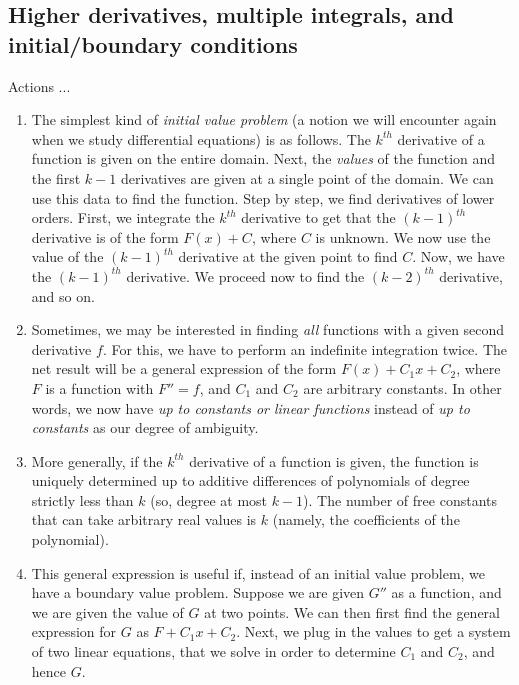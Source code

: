 \documentclass[10pt]{amsart}
\begin{document}
\subsection{Higher derivatives, multiple integrals, and initial/boundary conditions}

Actions ...

\begin{enumerate}
\item The simplest kind of {\em initial value problem} (a notion we
  will encounter again when we study differential equations) is as
  follows. The $k^{th}$ derivative of a function is given on the
  entire domain. Next, the {\em values} of the function and the first
  $k - 1$ derivatives are given at a single point of the domain. We
  can use this data to find the function. Step by step, we find
  derivatives of lower orders. First, we integrate the $k^{th}$
  derivative to get that the $(k-1)^{th}$ derivative is of the form
  $F(x) + C$, where $C$ is unknown. We now use the value of the
  $(k-1)^{th}$ derivative at the given point to find $C$. Now, we have
  the $(k-1)^{th}$ derivative. We proceed now to find the $(k-2)^{th}$
  derivative, and so on.
\item Sometimes, we may be interested in finding {\em all} functions
  with a given second derivative $f$. For this, we have to perform an
  indefinite integration twice. The net result will be a general
  expression of the form $F(x) + C_1x + C_2$, where $F$ is a function
  with $F'' = f$, and $C_1$ and $C_2$ are arbitrary constants. In
  other words, we now have {\em up to constants or linear functions}
  instead of {\em up to constants} as our degree of ambiguity.
\item More generally, if the $k^{th}$ derivative of a function is
  given, the function is uniquely determined up to additive
  differences of polynomials of degree strictly less than $k$ (so,
  degree at most $k - 1$). The number of free constants that can take
  arbitrary real values is $k$ (namely, the coefficients of the
  polynomial).
\item This general expression is useful if, instead of an initial
  value problem, we have a boundary value problem. Suppose we are
  given $G''$ as a function, and we are given the value of $G$ at two
  points. We can then first find the general expression for $G$ as $F
  + C_1x + C_2$. Next, we plug in the values to get a system of two
  linear equations, that we solve in order to determine $C_1$ and
  $C_2$, and hence $G$.
\end{enumerate}
\end{document}
